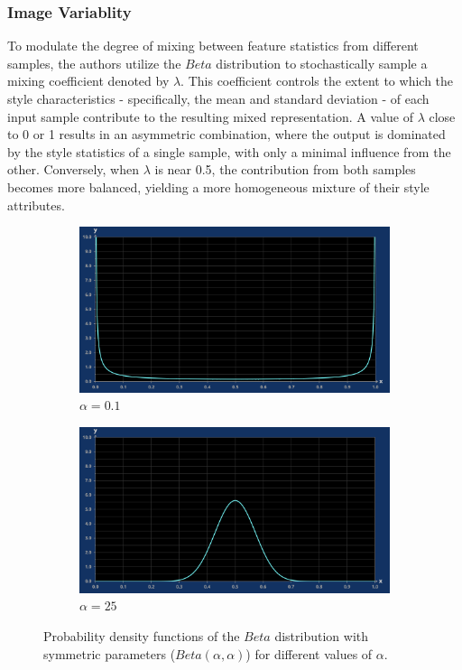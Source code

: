 \subsubsection{Image Variablity}\label{susec:variability}
To modulate the degree of mixing between feature statistics from different samples, the authors utilize the $Beta$ distribution to stochastically sample a mixing coefficient denoted by $\lambda$. This coefficient controls the extent to which the style characteristics - specifically, the mean and standard deviation - of each input sample contribute to the resulting mixed representation. A value of $\lambda$ close to 0 or 1 results in an asymmetric combination, where the output is dominated by the style statistics of a single sample, with only a minimal influence from the other. Conversely, when $\lambda$ is near 0.5, the contribution from both samples becomes more balanced, yielding a more homogeneous mixture of their style attributes.

\begin{figure}[h!]
	\centering
	\begin{subfigure}[b]{0.45\textwidth}
		\includegraphics[width=\textwidth]{images/beta01.png}
		\caption{$\alpha = 0.1$}
		\label{fig:alpha01}
	\end{subfigure}
	\hfill
	\begin{subfigure}[b]{0.45\textwidth}
		\includegraphics[width=\textwidth]{images/beta25.png}
		\caption{$\alpha = 25$}
		\label{fig:alpha25}
	\end{subfigure}
	\caption{Probability density functions of the $Beta$ distribution with symmetric parameters ($\text{$Beta$}(\alpha, \alpha)$) for different values of $\alpha$.}
	\label{fig:combined_images}
\end{figure}

